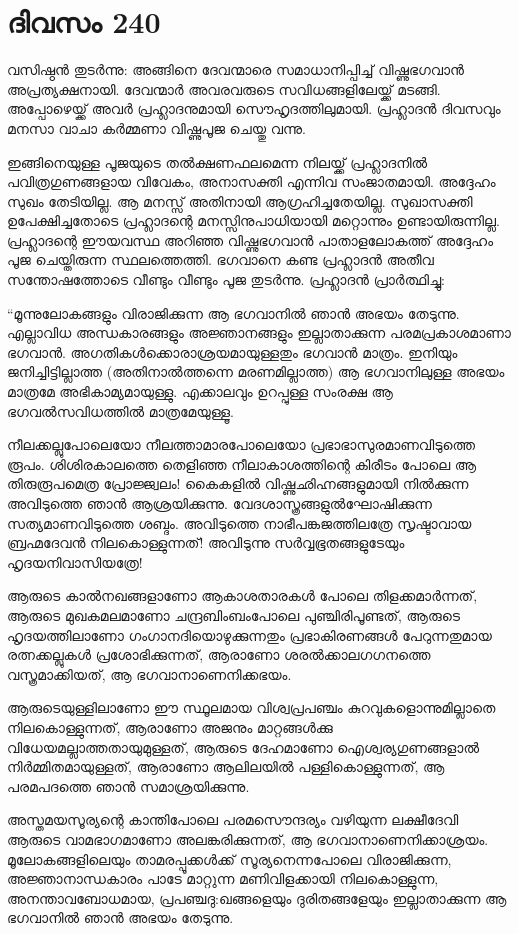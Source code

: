 \section{ദിവസം 240}


വസിഷ്ഠന്‍ തുടര്‍ന്നു: അങ്ങിനെ ദേവന്മാരെ സമാധാനിപ്പിച്ച് വിഷ്ണുഭഗവാന്‍ അപ്രത്യക്ഷനായി. ദേവന്മാര്‍ അവരവരുടെ സവിധങ്ങളിലേയ്ക്ക് മടങ്ങി. അപ്പോഴെയ്ക്ക് അവര്‍ പ്രഹ്ലാദനുമായി സൌഹൃദത്തിലുമായി. പ്രഹ്ലാദന്‍ ദിവസവും മനസാ വാചാ കര്‍മ്മണാ വിഷ്ണുപൂജ ചെയ്തു വന്നു. 

ഇങ്ങിനെയുള്ള പൂജയുടെ തല്‍ക്ഷണഫലമെന്ന നിലയ്ക്ക് പ്രഹ്ലാദനില്‍ പവിത്രഗുണങ്ങളായ വിവേകം, അനാസക്തി എന്നിവ സംജാതമായി. അദ്ദേഹം സുഖം തേടിയില്ല. ആ മനസ്സ് അതിനായി ആഗ്രഹിച്ചതേയില്ല. സുഖാസക്തി ഉപേക്ഷിച്ചതോടെ പ്രഹ്ലാദന്റെ മനസ്സിനുപാധിയായി മറ്റൊന്നും ഉണ്ടായിരുന്നില്ല. പ്രഹ്ലാദന്റെ ഈയവസ്ഥ അറിഞ്ഞ വിഷ്ണുഭഗവാന്‍ പാതാളലോകത്ത് അദ്ദേഹം പൂജ ചെയ്തിരുന്ന സ്ഥലത്തെത്തി. ഭഗവാനെ കണ്ട പ്രഹ്ലാദന്‍ അതീവ സന്തോഷത്തോടെ വീണ്ടും വീണ്ടും പൂജ തുടര്‍ന്നു. പ്രഹ്ലാദന്‍ പ്രാര്‍ത്ഥിച്ചു:

“മൂന്നുലോകങ്ങളും വിരാജിക്കുന്ന ആ ഭഗവാനില്‍ ഞാന്‍ അഭയം തേടുന്നു. എല്ലാവിധ അന്ധകാരങ്ങളും അജ്ഞാനങ്ങളും ഇല്ലാതാക്കുന്ന പരമപ്രകാശമാണാ ഭഗവാന്‍. അഗതികള്‍ക്കൊരാശ്രയമായുള്ളതും ഭഗവാന്‍ മാത്രം. ഇനിയും ജനിച്ചിട്ടില്ലാത്ത (അതിനാല്‍ത്തന്നെ മരണമില്ലാത്ത) ആ ഭഗവാനിലുള്ള അഭയം മാത്രമേ അഭികാമ്യമായുള്ളു. എക്കാലവും ഉറപ്പുള്ള സംരക്ഷ ആ ഭഗവല്‍സവിധത്തില്‍ മാത്രമേയുള്ളൂ.
     
നീലക്കല്ലുപോലെയോ നീലത്താമാരപോലെയോ പ്രഭാഭാസുരമാണവിടുത്തെ രൂപം. ശിശിരകാലത്തെ തെളിഞ്ഞ നീലാകാശത്തിന്റെ കിരീടം പോലെ ആ തിരുരൂപമെത്ര  പ്രോജ്ജ്വലം! കൈകളില്‍ വിഷ്ണുഛിഹ്നങ്ങളുമായി നില്‍ക്കുന്ന അവിടുത്തെ ഞാന്‍ ആശ്രയിക്കുന്നു. വേദശാസ്ത്രങ്ങളുല്‍ഘോഷിക്കുന്ന സത്യമാണവിടുത്തെ ശബ്ദം. അവിടുത്തെ നാഭീപങ്കജത്തിലത്രേ സൃഷ്ടാവായ ബ്രഹ്മദേവന്‍ നിലകൊള്ളുന്നത്! അവിടുന്നു സര്‍വ്വഭൂതങ്ങളുടേയും ഹൃദയനിവാസിയത്രേ!

ആരുടെ കാല്‍നഖങ്ങളാണോ ആകാശതാരകള്‍ പോലെ തിളക്കമാര്‍ന്നത്, ആരുടെ മുഖകമലമാണോ ചന്ദ്രബിംബംപോലെ പുഞ്ചിരിപൂണ്ടത്, ആരുടെ ഹൃദയത്തിലാണോ ഗംഗാനദിയൊഴുക്കുന്നതും പ്രഭാകിരണങ്ങള്‍ പേറുന്നതുമായ രത്നക്കല്ലുകള്‍ പ്രശോഭിക്കുന്നത്, ആരാണോ ശരല്‍ക്കാലഗഗനത്തെ വസ്ത്രമാക്കിയത്, ആ ഭഗവാനാണെനിക്കഭയം.

ആരുടെയുള്ളിലാണോ ഈ സ്ഥൂലമായ വിശ്വപ്രപഞ്ചം കുറവുകളൊന്നുമില്ലാതെ നിലകൊള്ളുന്നത്, ആരാണോ അജനും മാറ്റങ്ങള്‍ക്കു വിധേയമല്ലാത്തതായുമുള്ളത്, ആരുടെ ദേഹമാണോ ഐശ്വര്യഗുണങ്ങളാല്‍ നിര്‍മ്മിതമായുള്ളത്, ആരാണോ ആലിലയില്‍ പള്ളികൊള്ളുന്നത്, ആ പരമപദത്തെ ഞാന്‍ സമാശ്രയിക്കുന്നു. 

അസ്തമയസൂര്യന്റെ കാന്തിപോലെ പരമസൌന്ദര്യം വഴിയുന്ന ലക്ഷീദേവി ആരുടെ വാമഭാഗമാണോ അലങ്കരിക്കുന്നത്, ആ ഭഗവാനാണെനിക്കാശ്രയം. മൂലോകങ്ങളിലെയും താമരപ്പൂക്കള്‍ക്ക് സൂര്യനെന്നപോലെ വിരാജിക്കുന്ന, അജ്ഞാനാന്ധകാരം പാടേ മാറ്റുന്ന  മണിവിളക്കായി നിലകൊള്ളുന്ന, അനന്താവബോധമായ, പ്രപഞ്ചദു:ഖങ്ങളെയും ദുരിതങ്ങളേയും ഇല്ലാതാക്കുന്ന ആ ഭഗവാനില്‍ ഞാന്‍ അഭയം തേടുന്നു.
